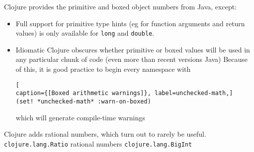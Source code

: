 Clojure provides the primitive and boxed object numbers from Java,
except:
\begin{itemize}
  \item Full support for primitive type hints (eg for function arguments and
  return values) is only available for \lstinline|long| and \lstinline|double|.
  \item Idiomatic Clojure obscures whether primitive or boxed values will be
  used in any particular chunk of code (even more than recent versions  Java)
  Because of this, it is good practice to begin every namespace with
\begin{lstlisting}[
caption={[Boxed arithmetic warnings]}, label=unchecked-math,]  
(set! *unchecked-math* :warn-on-boxed)
\end{lstlisting}
which will generate compile-time warnings
\end{itemize}

Clojure adds rational numbers, which turn out to rarely be useful.\\
\lstinline|clojure.lang.Ratio| rational numbers
\lstinline|clojure.lang.BigInt|~\cite[p.~428]{EmerickCarperGrand:2012:ClojureProgramming}

